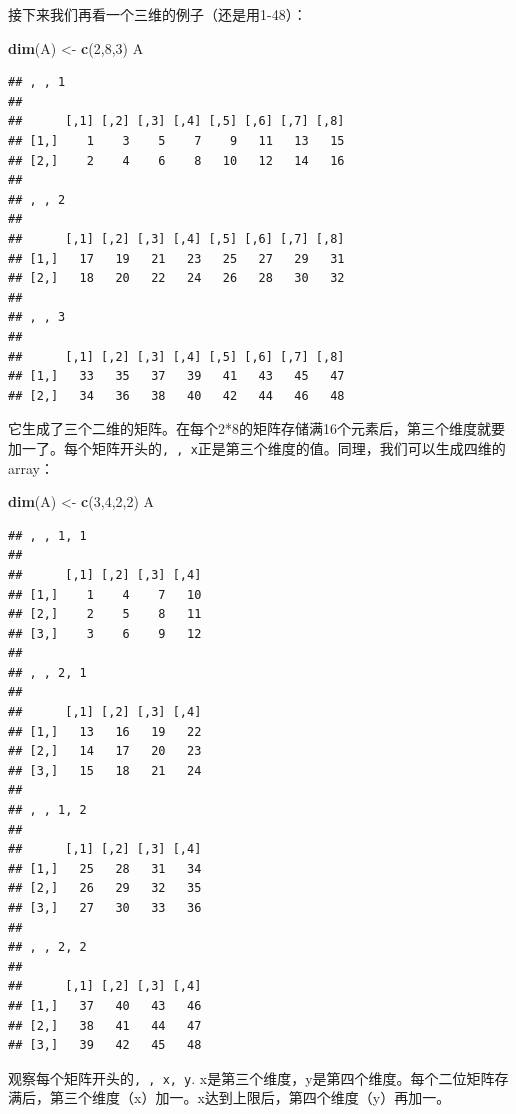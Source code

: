 \documentclass[]{book}
\newenvironment{Shaded}{\begin{snugshade}}{\end{snugshade}}
\newcommand{\DecValTok}[1]{\textcolor[rgb]{0.00,0.00,0.81}{#1}}
\newcommand{\KeywordTok}[1]{\textcolor[rgb]{0.13,0.29,0.53}{\textbf{#1}}}
\newcommand{\NormalTok}[1]{#1}
\newcommand{\StringTok}[1]{\textcolor[rgb]{0.31,0.60,0.02}{#1}}
\begin{document}
接下来我们再看一个三维的例子（还是用1-48）：

\begin{Shaded}
\begin{Highlighting}[]
\KeywordTok{dim}\NormalTok{(A) <-}\StringTok{ }\KeywordTok{c}\NormalTok{(}\DecValTok{2}\NormalTok{,}\DecValTok{8}\NormalTok{,}\DecValTok{3}\NormalTok{)}
\NormalTok{A}
\end{Highlighting}
\end{Shaded}

\begin{verbatim}
## , , 1
## 
##      [,1] [,2] [,3] [,4] [,5] [,6] [,7] [,8]
## [1,]    1    3    5    7    9   11   13   15
## [2,]    2    4    6    8   10   12   14   16
## 
## , , 2
## 
##      [,1] [,2] [,3] [,4] [,5] [,6] [,7] [,8]
## [1,]   17   19   21   23   25   27   29   31
## [2,]   18   20   22   24   26   28   30   32
## 
## , , 3
## 
##      [,1] [,2] [,3] [,4] [,5] [,6] [,7] [,8]
## [1,]   33   35   37   39   41   43   45   47
## [2,]   34   36   38   40   42   44   46   48
\end{verbatim}

它生成了三个二维的矩阵。在每个2*8的矩阵存储满16个元素后，第三个维度就要加一了。每个矩阵开头的\texttt{,\ ,\ x}正是第三个维度的值。同理，我们可以生成四维的array：

\begin{Shaded}
\begin{Highlighting}[]
\KeywordTok{dim}\NormalTok{(A) <-}\StringTok{ }\KeywordTok{c}\NormalTok{(}\DecValTok{3}\NormalTok{,}\DecValTok{4}\NormalTok{,}\DecValTok{2}\NormalTok{,}\DecValTok{2}\NormalTok{)}
\NormalTok{A}
\end{Highlighting}
\end{Shaded}

\begin{verbatim}
## , , 1, 1
## 
##      [,1] [,2] [,3] [,4]
## [1,]    1    4    7   10
## [2,]    2    5    8   11
## [3,]    3    6    9   12
## 
## , , 2, 1
## 
##      [,1] [,2] [,3] [,4]
## [1,]   13   16   19   22
## [2,]   14   17   20   23
## [3,]   15   18   21   24
## 
## , , 1, 2
## 
##      [,1] [,2] [,3] [,4]
## [1,]   25   28   31   34
## [2,]   26   29   32   35
## [3,]   27   30   33   36
## 
## , , 2, 2
## 
##      [,1] [,2] [,3] [,4]
## [1,]   37   40   43   46
## [2,]   38   41   44   47
## [3,]   39   42   45   48
\end{verbatim}

观察每个矩阵开头的\texttt{,\ ,\ x,\ y}. x是第三个维度，y是第四个维度。每个二位矩阵存满后，第三个维度（x）加一。x达到上限后，第四个维度（y）再加一。
\end{document}
